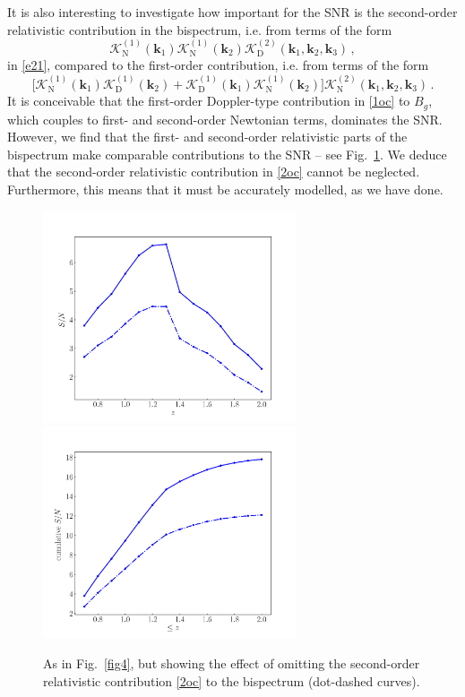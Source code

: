 It is also interesting to investigate how important for the SNR is the second-order relativistic contribution 
in the bispectrum, i.e. from terms of the form
\begin{equation} \label{2oc}
\mathcal{K}^{(1)}_{\mathrm{N}}(\bm{k}_{1})\mathcal{K}^{(1)}_{\mathrm{N}}(\bm{k}_{2})\mathcal{K}^{(2)}_{\mathrm{D}}(\bm{k}_{1},\bm{k}_{2},\bm{k}_{3})\,,
\end{equation}
 in \eqref{e21},  compared to the first-order contribution, i.e. from terms of the form
 \begin{equation} \label{1oc}
 \Big[\mathcal{K}^{(1)}_{\mathrm{N}}(\bm{k}_{1})\mathcal{K}^{(1)}_{\mathrm{D}}(\bm{k}_{2}) + \mathcal{K}^{(1)}_{\mathrm{D}}(\bm{k}_{1})\mathcal{K}^{(1)}_{\mathrm{N}}(\bm{k}_{2})\Big]\mathcal{K}^{(2)}_{\mathrm{N}}(\bm{k}_{1},\bm{k}_{2},\bm{k}_{3}) \,.
 \end{equation}
 It is conceivable that the first-order Doppler-type contribution in \eqref{1oc} to $B_g$, which couples to first- and second-order Newtonian terms, dominates the SNR. However, we find that the first- and  second-order relativistic parts of the bispectrum make comparable contributions to the SNR -- see Fig.~\ref{fig4z}. We deduce that the second-order relativistic contribution in \eqref{2oc} cannot be neglected. Furthermore, this means that it must be accurately modelled, as we  have done. 
\begin{figure}[ht]
\centering
\includegraphics[width=7.5cm]{fig/DoppSnr_K2D-eps-converted-to}
\includegraphics[width=7.5cm]{fig/cumDoppSnr_K2D-eps-converted-to}
\caption{As in Fig.~\ref{fig4}, but showing the effect of omitting the second-order relativistic contribution \eqref{2oc} to the bispectrum (dot-dashed curves).} \label{fig4z}
\end{figure}

